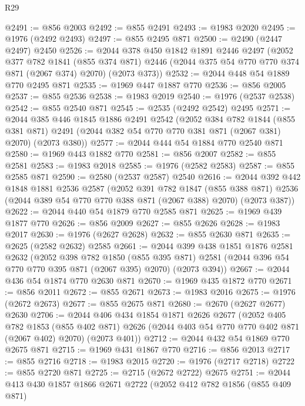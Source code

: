 \begin{lexlean}{R29}
\begin{coremodule}
@2491 := @856 @2003
@2492 := @855 @2491
@2493 := @1983 @2020
@2495 := @1976 (@2492 @2493)
@2497 := @855 @2495 @871
@2500 := @2490 (@2447 @2497) @2450
@2526 := @2044
    @378
    @450
    @1842
    @1891
    @2446
    @2497
    (@2052
      @377
      @782
      @1841
      (@855 @374 @871)
      @2446
      (@2044 @375 @54 @770 @770 @374 @871 (@2067 @374) @2070)
      (@2073 @373))
@2532 := @2044 @448 @54 @1889 @770 @2495 @871
@2535 := @1969 @447 @1887 @770
@2536 := @856 @2005
@2537 := @855 @2536
@2538 := @1983 @2019
@2540 := @1976 (@2537 @2538)
@2542 := @855 @2540 @871
@2545 := @2535 (@2492 @2542) @2495
@2571 := @2044
    @385
    @446
    @1845
    @1886
    @2491
    @2542
    (@2052
      @384
      @782
      @1844
      (@855 @381 @871)
      @2491
      (@2044 @382 @54 @770 @770 @381 @871 (@2067 @381) @2070)
      (@2073 @380))
@2577 := @2044 @444 @54 @1884 @770 @2540 @871
@2580 := @1969 @443 @1882 @770
@2581 := @856 @2007
@2582 := @855 @2581
@2583 := @1983 @2018
@2585 := @1976 (@2582 @2583)
@2587 := @855 @2585 @871
@2590 := @2580 (@2537 @2587) @2540
@2616 := @2044
    @392
    @442
    @1848
    @1881
    @2536
    @2587
    (@2052
      @391
      @782
      @1847
      (@855 @388 @871)
      @2536
      (@2044 @389 @54 @770 @770 @388 @871 (@2067 @388) @2070)
      (@2073 @387))
@2622 := @2044 @440 @54 @1879 @770 @2585 @871
@2625 := @1969 @439 @1877 @770
@2626 := @856 @2009
@2627 := @855 @2626
@2628 := @1983 @2017
@2630 := @1976 (@2627 @2628)
@2632 := @855 @2630 @871
@2635 := @2625 (@2582 @2632) @2585
@2661 := @2044
    @399
    @438
    @1851
    @1876
    @2581
    @2632
    (@2052
      @398
      @782
      @1850
      (@855 @395 @871)
      @2581
      (@2044 @396 @54 @770 @770 @395 @871 (@2067 @395) @2070)
      (@2073 @394))
@2667 := @2044 @436 @54 @1874 @770 @2630 @871
@2670 := @1969 @435 @1872 @770
@2671 := @856 @2011
@2672 := @855 @2671
@2673 := @1983 @2016
@2675 := @1976 (@2672 @2673)
@2677 := @855 @2675 @871
@2680 := @2670 (@2627 @2677) @2630
@2706 := @2044
    @406
    @434
    @1854
    @1871
    @2626
    @2677
    (@2052
      @405
      @782
      @1853
      (@855 @402 @871)
      @2626
      (@2044 @403 @54 @770 @770 @402 @871 (@2067 @402) @2070)
      (@2073 @401))
@2712 := @2044 @432 @54 @1869 @770 @2675 @871
@2715 := @1969 @431 @1867 @770
@2716 := @856 @2013
@2717 := @855 @2716
@2718 := @1983 @2015
@2720 := @1976 (@2717 @2718)
@2722 := @855 @2720 @871
@2725 := @2715 (@2672 @2722) @2675
@2751 := @2044
    @413
    @430
    @1857
    @1866
    @2671
    @2722
    (@2052
      @412
      @782
      @1856
      (@855 @409 @871)

\end{coremodule}
\end{lexlean}

